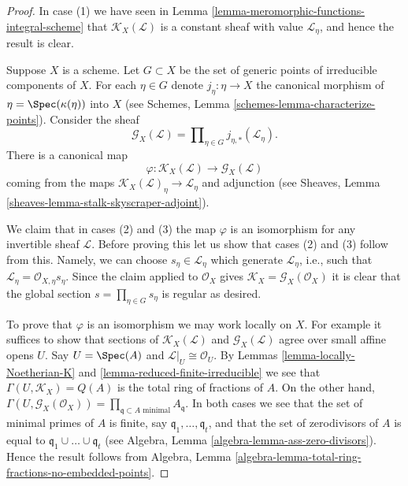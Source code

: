 \begin{proof}
In case (1) we have seen in
Lemma \ref{lemma-meromorphic-functions-integral-scheme}
that $\mathcal{K}_X(\mathcal{L})$ is a constant sheaf
with value $\mathcal{L}_\eta$, and hence the result is clear.

\medskip\noindent
Suppose $X$ is a scheme. Let $G \subset X$ be the set of
generic points of irreducible components of $X$. For each $\eta \in G$
denote $j_\eta : \eta \to X$ the canonical morphism
of $\eta = \Spec(\kappa(\eta))$ into $X$
(see Schemes, Lemma \ref{schemes-lemma-characterize-points}). Consider
the sheaf
$$
\mathcal{G}_X(\mathcal{L})
=
\prod\nolimits_{\eta \in G} j_{\eta, *}(\mathcal{L}_\eta).
$$
There is a canonical map
$$
\varphi :
\mathcal{K}_X(\mathcal{L})
\longrightarrow
\mathcal{G}_X(\mathcal{L})
$$
coming from the maps $\mathcal{K}_X(\mathcal{L})_\eta \to \mathcal{L}_\eta$
and adjunction (see
Sheaves, Lemma \ref{sheaves-lemma-stalk-skyscraper-adjoint}).

\medskip\noindent
We claim that in cases (2) and (3) the map $\varphi$ is an isomorphism
for any invertible sheaf $\mathcal{L}$.
Before proving this let us show that cases (2) and (3) follow from this.
Namely, we can choose $s_\eta \in \mathcal{L}_\eta$ which
generate $\mathcal{L}_\eta$, i.e., such that
$\mathcal{L}_\eta = \mathcal{O}_{X, \eta}s_\eta$.
Since the claim applied to $\mathcal{O}_X$ gives
$\mathcal{K}_X = \mathcal{G}_X(\mathcal{O}_X)$ it is
clear that the global section $s = \prod_{\eta \in G} s_\eta$
is regular as desired.

\medskip\noindent
To prove that $\varphi$ is an isomorphism we may work locally on $X$.
For example it suffices to show that sections of
$\mathcal{K}_X(\mathcal{L})$ and $\mathcal{G}_X(\mathcal{L})$
agree over small affine opens $U$. Say $U = \Spec(A)$ and
$\mathcal{L}|_U \cong \mathcal{O}_U$. By
Lemmas \ref{lemma-locally-Noetherian-K} and
\ref{lemma-reduced-finite-irreducible}
we see that $\Gamma(U, \mathcal{K}_X) = Q(A)$ is
the total ring of fractions of $A$. On the other hand,
$\Gamma(U, \mathcal{G}_X(\mathcal{O}_X)) =
\prod_{\mathfrak q \subset A \text{ minimal}} A_{\mathfrak q}$.
In both cases we see that the set of minimal primes of $A$
is finite, say $\mathfrak q_1, \ldots, \mathfrak q_t$,
and that the set of zerodivisors of $A$ is equal to
$\mathfrak q_1 \cup \ldots \cup \mathfrak q_t$ (see
Algebra, Lemma \ref{algebra-lemma-ass-zero-divisors}).
Hence the result follows from
Algebra, Lemma \ref{algebra-lemma-total-ring-fractions-no-embedded-points}.
\end{proof}

